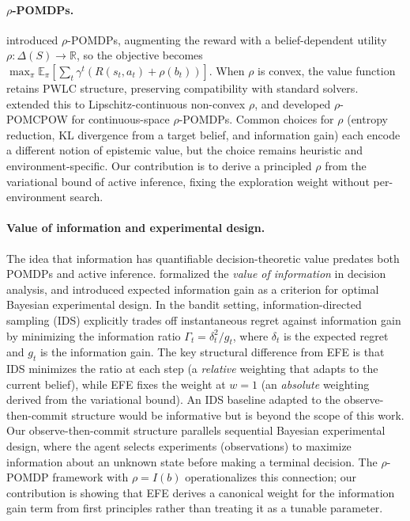 \documentclass[runningheads]{llncs}
\begin{document}
\paragraph{$\rho$-POMDPs.}
\citet{araya2010} introduced $\rho$-POMDPs, augmenting the reward with a belief-dependent utility $\rho : \Delta(S) \to \mathbb{R}$, so the objective becomes $\max_\pi \mathbb{E}_\pi[\sum_t \gamma^t (R(s_t,a_t) + \rho(b_t))]$. When $\rho$ is convex, the value function retains PWLC structure, preserving compatibility with standard solvers. \citet{fehr2018} extended this to Lipschitz-continuous non-convex $\rho$, and \citet{benchetrit2025} developed $\rho$-POMCPOW for continuous-space $\rho$-POMDPs. Common choices for $\rho$ (entropy reduction, KL divergence from a target belief, and information gain) each encode a different notion of epistemic value, but the choice remains heuristic and environment-specific. Our contribution is to derive a principled $\rho$ from the variational bound of active inference, fixing the exploration weight without per-environment search.

\paragraph{Value of information and experimental design.}
The idea that information has quantifiable decision-theoretic value predates both POMDPs and active inference. \citet{howard1966} formalized the \emph{value of information} in decision analysis, and \citet{lindley1956} introduced expected information gain as a criterion for optimal Bayesian experimental design. In the bandit setting, information-directed sampling (IDS) \citep{russo2014} explicitly trades off instantaneous regret against information gain by minimizing the information ratio $\Gamma_t = \delta_t^2 / g_t$, where $\delta_t$ is the expected regret and $g_t$ is the information gain. The key structural difference from EFE is that IDS minimizes the ratio at each step (a \emph{relative} weighting that adapts to the current belief), while EFE fixes the weight at $w{=}1$ (an \emph{absolute} weighting derived from the variational bound). An IDS baseline adapted to the observe-then-commit structure would be informative but is beyond the scope of this work. Our observe-then-commit structure parallels sequential Bayesian experimental design, where the agent selects experiments (observations) to maximize information about an unknown state before making a terminal decision. The $\rho$-POMDP framework with $\rho = I(b)$ operationalizes this connection; our contribution is showing that EFE derives a canonical weight for the information gain term from first principles rather than treating it as a tunable parameter.
\end{document}
